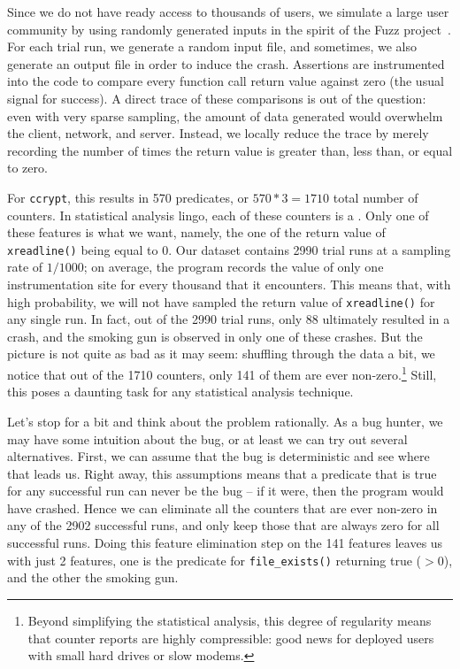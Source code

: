 Since we do not have ready access to thousands of users, we simulate
a large user community by using randomly generated inputs in the
spirit of the Fuzz project~\cite{MKLMMNS95}.  For each trial run, we
generate a random input file, and sometimes, we also generate an
output file in order to induce the crash.  Assertions are instrumented
into the code to compare every function call return value against zero
(the usual signal for success).  A direct trace of these comparisons
is out of the question: even with very sparse sampling, the
amount of data generated would overwhelm the client, network, and
server.  Instead, we locally reduce the trace by merely recording the
number of times the return value is greater than, less than, or equal
to zero.

For \texttt{ccrypt}, this results in 570 predicates, or $570 * 3 =
1710$ total number of counters.  In statistical analysis lingo, each
of these counters is a .  Only one of these features
is what we want, namely, the one of the return value of
\texttt{xreadline()} being equal to 0.  Our dataset contains 2990
trial runs at a sampling rate of $1/1000$; on average, the
program records the value of only one instrumentation site for every
thousand that it encounters.  This means that, with high probability,
we will not have sampled the return value of \texttt{xreadline()} for
any single run.  In fact, out of the 2990 trial runs, only 88
ultimately resulted in a crash, and the smoking gun is observed in
only one of these crashes.  But the picture is not quite as bad as it
may seem: shuffling through the data a bit, we notice that out of the
1710 counters, only 141 of them are ever non-zero.\footnote{Beyond
  simplifying the statistical analysis, this degree of regularity
  means that counter reports are highly compressible: good news for
  deployed users with small hard drives or slow modems.}  Still, this
poses a daunting task for any statistical analysis technique.

Let's stop for a bit and think about the problem rationally.  As a bug
hunter, we may have some intuition about the bug, or at least we can
try out several alternatives.  First, we can assume that the bug is
deterministic and see where that leads us.  Right away, this
assumptions means that a predicate that is true for any successful run
can never be the bug -- if it were, then the program would have
crashed.  Hence we can eliminate all the counters that are ever
non-zero in any of the 2902 successful runs, and only keep those
that are always zero for all successful runs. Doing this feature
elimination step on the 141 features leaves us with just 2 features,
one is the predicate for \texttt{file\_exists()} returning true ($>
0$), and the other the smoking gun.

